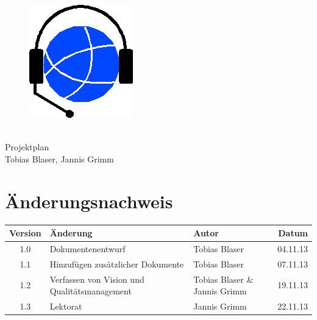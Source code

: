 
\usepackage{csvsimple}

\providecommand{\documentType}{Projektplan}
\providecommand{\versionnumber}{1.0}



\thispagestyle{empty}
\begin{titlepage}
	\begin{center}

	\vspace*{40mm}
	
	\begin{figure}[htp]
		\centering
		\includegraphics[scale=0.60]{../img/icon-js-voip.png}
	\end{figure}		
	\vspace*{20mm}
	
	{\fontsize{40}{48} \selectfont \project \\[10mm]}
	{\fontsize{40}{48} \selectfont \documentType \\[5mm]}	
	\vspace*{20mm}
	Tobias Blaser, Jannis Grimm

\end{center}
\end{titlepage}
\clearpage

\chapter*{Änderungsnachweis}
\begin{tabularx}{\textwidth}{|cXlr|} %
		\hline
		\textbf{Version} & \textbf{Änderung} & \textbf{Autor} & \textbf{Datum}\\
		\hline
		1.0 & Dokumentenentwurf & Tobias Blaser & 04.11.13\\
		1.1 & Hinzufügen zusätzlicher Dokumente & Tobias Blaser & 07.11.13\\
		1.2 & Verfassen von Vision und Qualitätsmanagement & Tobias Blaser \& Jannis Grimm & 19.11.13\\
		1.3 & Lektorat & Jannis Grimm & 22.11.13\\
		\hline
\end{tabularx}

